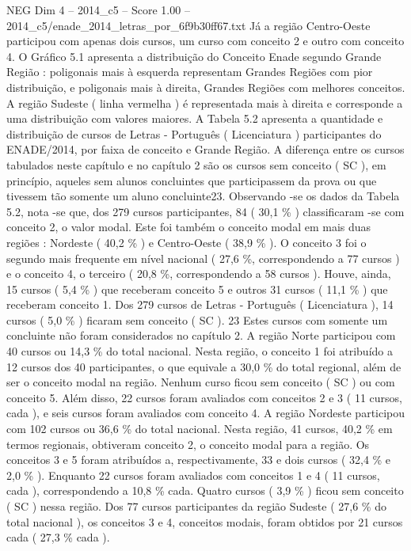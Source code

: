 \begin{textsample}{NEG Dim 4 – 2014\_c5 – Score 1.00 – 2014\_c5/enade\_2014\_letras\_por\_6f9b30ff67.txt}
Já a região Centro-Oeste participou com apenas dois cursos, um curso com conceito 2 e outro com conceito 4.
O Gráfico 5.1 apresenta a distribuição do Conceito Enade segundo Grande Região : poligonais mais à esquerda representam Grandes Regiões com pior distribuição, e poligonais mais à direita, Grandes Regiões com melhores conceitos.
A região Sudeste ( linha vermelha ) é representada mais à direita e corresponde a uma distribuição com valores maiores.
A Tabela 5.2 apresenta a quantidade e distribuição de cursos de Letras - Português ( Licenciatura ) participantes do ENADE/2014, por faixa de conceito e Grande Região.
A diferença entre os cursos tabulados neste capítulo e no capítulo 2 são os cursos sem conceito ( SC ), em princípio, aqueles sem alunos concluintes que participassem da prova ou que tivessem tão somente um aluno concluinte23.
Observando -se os dados da Tabela 5.2, nota -se que, dos 279 cursos participantes, 84 ( 30,1 \% ) classificaram -se com conceito 2, o valor modal.
Este foi também o conceito modal em mais duas regiões : Nordeste ( 40,2 \% ) e Centro-Oeste ( 38,9 \% ).
O conceito 3 foi o segundo mais frequente em nível nacional ( 27,6 \%, correspondendo a 77 cursos ) e o conceito 4, o terceiro ( 20,8 \%, correspondendo a 58 cursos ).
Houve, ainda, 15 cursos ( 5,4 \% ) que receberam conceito 5 e outros 31 cursos ( 11,1 \% ) que receberam conceito 1.
Dos 279 cursos de Letras - Português ( Licenciatura ), 14 cursos ( 5,0 \% ) ficaram sem conceito ( SC ). 23 Estes cursos com somente um concluinte não foram considerados no capítulo 2.
A região Norte participou com 40 cursos ou 14,3 \% do total nacional.
Nesta região, o conceito 1 foi atribuído a 12 cursos dos 40 participantes, o que equivale a 30,0 \% do total regional, além de ser o conceito modal na região.
Nenhum curso ficou sem conceito ( SC ) ou com conceito 5.
Além disso, 22 cursos foram avaliados com conceitos 2 e 3 ( 11 cursos, cada ), e seis cursos foram avaliados com conceito 4.
A região Nordeste participou com 102 cursos ou 36,6 \% do total nacional.
Nesta região, 41 cursos, 40,2 \% em termos regionais, obtiveram conceito 2, o conceito modal para a região.
Os conceitos 3 e 5 foram atribuídos a, respectivamente, 33 e dois cursos ( 32,4 \% e 2,0 \% ).
Enquanto 22 cursos foram avaliados com conceitos 1 e 4 ( 11 cursos, cada ), correspondendo a 10,8 \% cada.
Quatro cursos ( 3,9 \% ) ficou sem conceito ( SC ) nessa região.
Dos 77 cursos participantes da região Sudeste ( 27,6 \% do total nacional ), os conceitos 3 e 4, conceitos modais, foram obtidos por 21 cursos cada ( 27,3 \% cada ).

\end{textsample}

